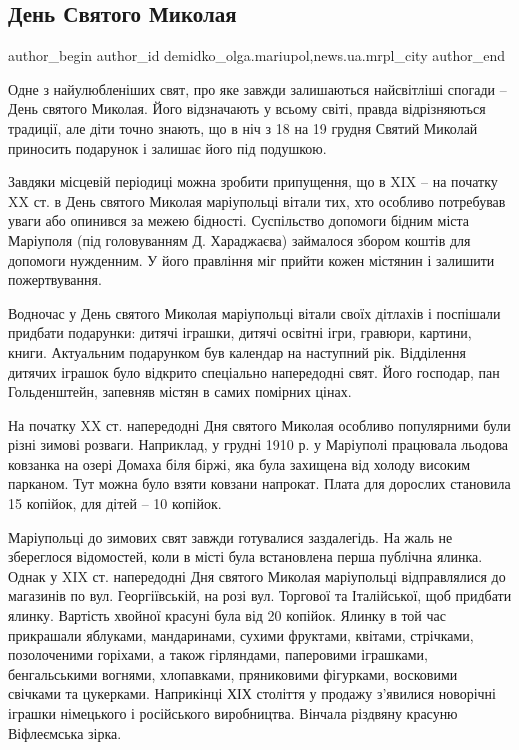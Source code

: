  
 
 
 
 
 
\subsection{День Святого Миколая}
\label{sec:18_12_2017.stz.news.ua.mrpl_city.1.den_svjatogo_mykolaja}
 
\ifcmt
 author_begin
   author_id demidko_olga.mariupol,news.ua.mrpl_city
 author_end
\fi

Одне з найулюбленіших свят, про яке завжди залишаються найсвітліші спогади –
День святого Миколая. Його відзначають у всьому світі, правда відрізняються
традиції, але діти точно знають, що в ніч з 18 на 19 грудня Святий Миколай
приносить подарунок і залишає його під подушкою.

Завдяки місцевій періодиці можна зробити припущення, що в XIX – на початку XX
ст. в День святого Миколая маріупольці вітали тих, хто особливо потребував
уваги або опинився за межею бідності. Суспільство допомоги бідним міста
Маріуполя (під головуванням Д. Хараджаєва) займалося збором коштів для допомоги
нужденним. У його правління міг прийти кожен містянин і залишити пожертвування.

Водночас у День святого Миколая маріупольці вітали своїх дітлахів і поспішали
придбати подарунки: дитячі іграшки, дитячі освітні ігри, гравюри, картини,
книги. Актуальним подарунком був календар на наступний рік. Відділення дитячих
іграшок було відкрито спеціально напередодні свят. Його господар, пан
Гольденштейн, запевняв містян в самих помірних цінах.

На початку XX ст. напередодні Дня святого Миколая особливо популярними були
різні зимові розваги. Наприклад, у грудні 1910 р. у Маріуполі працювала льодова
ковзанка на озері Домаха біля біржі, яка була захищена від холоду високим
парканом. Тут можна було взяти ковзани напрокат. Плата для дорослих становила
15 копійок, для дітей – 10 копійок.

Маріупольці до зимових свят завжди готувалися заздалегідь. На жаль не
збереглося відомостей, коли в місті була встановлена перша публічна ялинка.
Однак у XIX ст. напередодні Дня святого Миколая маріупольці відправлялися до
магазинів по вул. Георгіївській, на розі вул. Торгової та Італійської, щоб
придбати ялинку. Вартість хвойної красуні була від 20 копійок. Ялинку в той час
прикрашали яблуками, мандаринами, сухими фруктами, квітами, стрічками,
позолоченими горіхами, а також гірляндами, паперовими іграшками, бенгальськими
вогнями, хлопавками, пряниковими фігурками, восковими свічками та цукерками.
Наприкінці ХІХ століття у продажу з'явилися новорічні іграшки німецького і
російського виробництва. Вінчала різдвяну красуню Віфлеємська зірка.

